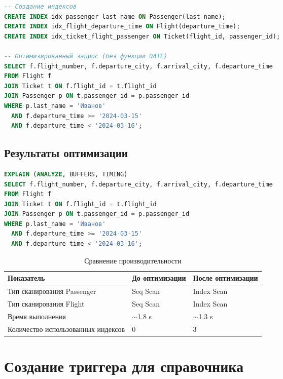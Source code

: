 \documentclass[a4paper,12pt]{article}
\begin{document}
\begin{lstlisting}[language=SQL, caption=Создание индексов и оптимизированный запрос]
-- Создание индексов
CREATE INDEX idx_passenger_last_name ON Passenger(last_name);
CREATE INDEX idx_flight_departure_time ON Flight(departure_time);
CREATE INDEX idx_ticket_flight_passenger ON Ticket(flight_id, passenger_id);

-- Оптимизированный запрос (без функции DATE)
SELECT f.flight_number, f.departure_city, f.arrival_city, f.departure_time
FROM Flight f
JOIN Ticket t ON f.flight_id = t.flight_id
JOIN Passenger p ON t.passenger_id = p.passenger_id
WHERE p.last_name = 'Иванов' 
  AND f.departure_time >= '2024-03-15' 
  AND f.departure_time < '2024-03-16';
\end{lstlisting}

\subsection{Результаты оптимизации}

\begin{lstlisting}[language=SQL, caption=Анализ оптимизированного запроса]
EXPLAIN (ANALYZE, BUFFERS, TIMING) 
SELECT f.flight_number, f.departure_city, f.arrival_city, f.departure_time
FROM Flight f
JOIN Ticket t ON f.flight_id = t.flight_id
JOIN Passenger p ON t.passenger_id = p.passenger_id
WHERE p.last_name = 'Иванов' 
  AND f.departure_time >= '2024-03-15' 
  AND f.departure_time < '2024-03-16';
\end{lstlisting}

\begin{table}[H]
\centering
\caption{Сравнение производительности}
\begin{tabular}{|p{5cm}|p{4cm}|p{4cm}|}
\hline
\textbf{Показатель} & \textbf{До оптимизации} & \textbf{После оптимизации} \\
\hline
Тип сканирования Passenger & Seq Scan & Index Scan \\
\hline
Тип сканирования Flight & Seq Scan & Index Scan \\
\hline
Время выполнения & $\sim$1.8 s & $\sim$1.3 s \\
\hline
Количество использованных индексов & 0 & 3 \\
\hline
\end{tabular}
\end{table}

\section{Создание триггера для справочника}
\end{document}
